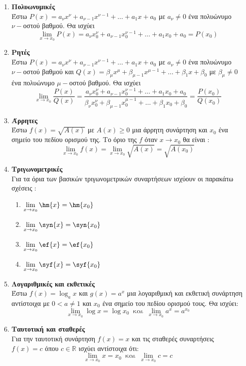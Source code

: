 \documentclass[twoside,nofonts,ektypwsh,math,spyros]{frontisthrio}
\begin{document}
\begin{enumerate}[label=\bf\arabic*.]
\item \textbf{Πολυωνυμικές}\\
Έστω $ P(x)=a_\nu x^\nu+a_{\nu-1}x^{\nu-1}+\ldots+a_1x+a_0 $ με $ a_\nu\neq0 $ ένα πολυώνυμο $ \nu- $οστού βαθμού. Θα ισχύει
\[ \lim_{x\rightarrow x_0}{P(x)}=a_\nu x^\nu_0+a_{\nu-1}x^{\nu-1}_0+\ldots+a_1x_0+a_0=P(x_0) \]
\item \textbf{Ρητές}\\
Έστω $ P(x)=a_\nu x^\nu+a_{\nu-1}x^{\nu-1}+\ldots+a_1x+a_0 $ με $ a_\nu\neq0 $ ένα πολυώνυμο $ \nu- $οστού βαθμού και $ Q(x)=\beta_\mu x^\mu+\beta_{\mu-1}x^{\mu-1}+\ldots+\beta_1x+\beta_0 $ με $ \beta_\mu\neq0 $ ένα πολυώνυμο $ \mu- $οστού βαθμού. Θα ισχύει
\[ \lim_{x\rightarrow x_0}{\frac{P(x)}{Q(x)}}=\frac{a_\nu x^\nu_0+a_{\nu-1}x^{\nu-1}_0+\ldots+a_1x_0+a_0}{\beta_\nu x^\nu_0+\beta_{\mu-1}x^{\mu-1}_0+\ldots+\beta_1x_0+\beta_0}=\frac{P(x_0)}{Q(x_0)} \]
\item \textbf{Άρρητες}\\
Έστω $ f(x)=\sqrt{A(x)} $ με $ A(x)\geq0 $ μια άρρητη συνάρτηση και $ x_0 $ ένα σημείο του πεδίου ορισμού της. Το όριο της $ f $ όταν $ x\to x_0 $ θα είναι :
\[ \lim_{x\to x_0}{f(x)}=\lim_{x\to x_0}{\sqrt{A(x)}}=\sqrt{A(x_0)} \]
\item \textbf{Τριγωνομετρικές}\\
Για τα όρια των βασικών τριγωνομετρικών συναρτήσεων ισχύουν οι παρακάτω σχέσεις :
\begin{multicols}{2}
\begin{enumerate}[label=\roman*.]
\item $ \displaystyle{\lim_{x\rightarrow x_0}{\hm{x}}=\hm{x_0}} $
\item $ \displaystyle{\lim_{x\rightarrow x_0}{\syn{x}}=\syn{x_0}} $
\item $ \displaystyle{\lim_{x\rightarrow x_0}{\ef{x}}=\ef{x_0}} $
\item $ \displaystyle{\lim_{x\rightarrow x_0}{\syf{x}}=\syf{x_0}} $
\end{enumerate}
\end{multicols}
\item \textbf{Λογαριθμικές και εκθετικές}\\
Έστω $ f(x)=\log_{a}{x} $ και $ g(x)=a^x $ μια λογαριθμική και εκθετική συνάρτηση αντίστοιχα με $ 0<a\neq 1 $ και $ x_0 $ ένα σημείο του πεδίου ορισμού τους. Θα ισχύει:
\[ \lim_{x\to x_0}{\log{x}}=\log{x_0}\ \textrm{ και }\ \lim_{x\to x_0}{a^x}=a^{x_0} \]
\item \textbf{Ταυτοτική και σταθερές}\\
Για την ταυτοτική συνάρτηση $ f(x)=x $ και τις σταθερές συναρτήσεις $ f(x)=c $ όπου $ c\in\mathbb{R} $ ισχύει αντίστοιχα ότι:
\[ \lim_{x\to x_0}{x}=x_0\ \textrm{ και }\ \lim_{x\to x_0}{c}=c \]
\end{enumerate}
\end{document}
